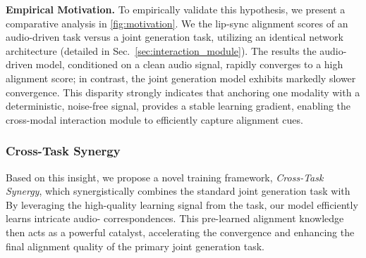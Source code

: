 \noindent\textbf{Empirical Motivation.}
To empirically validate this hypothesis, we present a comparative analysis in \cref{fig:motivation}. We  the lip-sync alignment scores of an audio-driven  task versus a joint  generation task, utilizing an identical network architecture (detailed in Sec.~\ref{sec:interaction_module}). The results %
the audio-driven model, conditioned on a clean audio signal, rapidly converges to a high alignment score; in contrast, the joint generation model exhibits markedly slower convergence. This disparity strongly indicates that anchoring one modality with a deterministic, noise-free signal, 
provides a stable learning gradient, enabling the cross-modal interaction module to efficiently capture alignment cues.





\subsubsection{Cross-Task Synergy}
\label{ssubsec:framework}

\noindent\textbf{%
}
Based on this insight, we propose a novel training framework, \textit{Cross-Task Synergy}, which synergistically combines the standard joint  generation task  with 
By leveraging the high-quality learning signal from the  task, our model efficiently learns intricate audio- correspondences. This pre-learned alignment knowledge then acts as a powerful catalyst, accelerating the convergence and enhancing the final alignment quality of the primary joint generation task.


